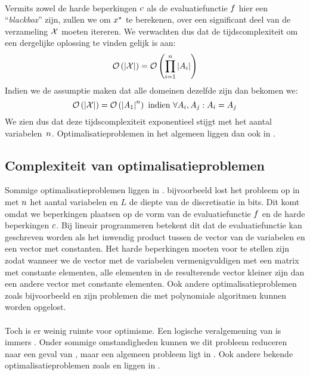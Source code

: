 \paragraph{}
Vermits zowel de harde beperkingen $c$ als de evaluatiefunctie $f$ hier een ``\emph{blackbox}'' zijn, zullen we om $x^{\star}$ te berekenen, over een significant deel van de verzameling $\mathcal{X}$ moeten itereren. We verwachten dus dat de tijdscomplexiteit om een dergelijke oplossing te vinden gelijk is aan:
\begin{equation}
\mathcal{O}\left(\left| \mathcal{X}\right|\right)=\mathcal{O}\left(\displaystyle\prod_{i=1}^n\left| A_i\right|\right)
\end{equation}
Indien we de assumptie maken dat alle domeinen dezelfde zijn dan bekomen we:
\begin{equation}
\mathcal{O}\left(\left| \mathcal{X}\right|\right)=\mathcal{O}\left(\left| A_1\right|^n\right)\mbox{ indien }\forall A_i,A_j: A_i=A_j
\end{equation}
We zien dus dat deze tijdscomplexiteit exponentieel stijgt met het aantal variabelen~$n$. Optimalisatieproblemen in het algemeen liggen dan ook in .

\subsection{Complexiteit van optimalisatieproblemen}

Sommige optimalisatieproblemen liggen in . \cite{linearProgrammingInP} bijvoorbeeld lost het  probleem op in  met $n$ het aantal variabelen en $L$ de diepte van de discretisatie in bits. Dit komt omdat we beperkingen plaatsen op de vorm van de evaluatiefunctie $f$ en de harde beperkingen $c$. Bij lineair programmeren betekent dit dat de evaluatiefunctie kan geschreven worden als het inwendig product tussen de vector van de variabelen en een vector met constanten. Het harde beperkingen moeten voor te stellen zijn zodat wanneer we de vector met de variabelen vermenigvuldigen met een matrix met constante elementen, alle elementen in de resulterende vector kleiner zijn dan een andere vector met constante elementen. Ook andere optimalisatieproblemen zoals bijvoorbeeld  en  zijn problemen die met polynomiale algoritmen kunnen worden opgelost.

\paragraph{}
Toch is er weinig ruimte voor optimisme. Een logische veralgemening van  is immers . Onder sommige omstandigheden kunnen we dit probleem reduceren naar een geval van \cite{Kozlov1980223}, maar een algemeen  probleem ligt in \cite{qpInNP}. Ook andere bekende optimalisatieproblemen zoals  en  liggen in .

